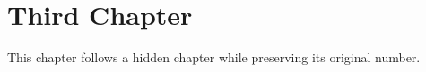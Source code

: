 \chapter{Third Chapter}
\label{chap:third}
This chapter follows a hidden chapter while preserving its original number.
